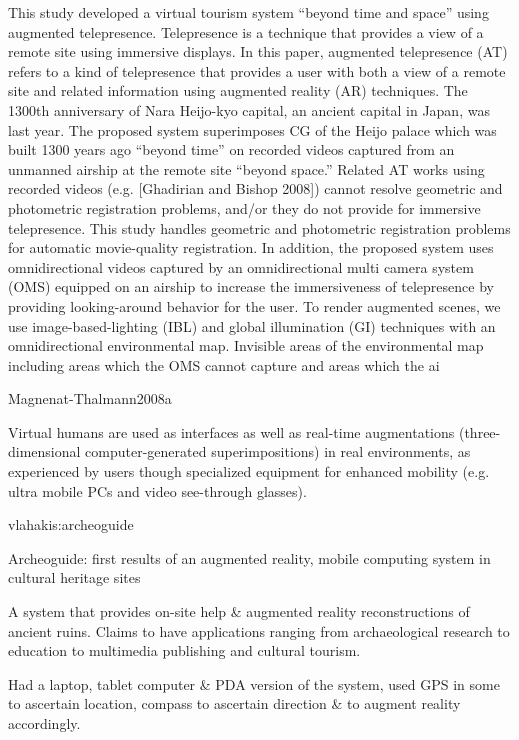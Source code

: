 This study developed a virtual tourism system “beyond time and
space” using augmented telepresence. Telepresence is a technique
that provides a view of a remote site using immersive displays. In
this paper, augmented telepresence (AT) refers to a kind of telepresence
that provides a user with both a view of a remote site and
related information using augmented reality (AR) techniques.
The 1300th anniversary of Nara Heijo-kyo capital, an ancient capital
in Japan, was last year. The proposed system superimposes
CG of the Heijo palace which was built 1300 years ago “beyond
time” on recorded videos captured from an unmanned airship at
the remote site “beyond space.” Related AT works using recorded
videos (e.g. [Ghadirian and Bishop 2008]) cannot resolve geometric
and photometric registration problems, and/or they do not provide
for immersive telepresence. This study handles geometric and
photometric registration problems for automatic movie-quality registration.
In addition, the proposed system uses omnidirectional
videos captured by an omnidirectional multi camera system (OMS)
equipped on an airship to increase the immersiveness of telepresence
by providing looking-around behavior for the user. To render
augmented scenes, we use image-based-lighting (IBL) and global
illumination (GI) techniques with an omnidirectional environmental
map. Invisible areas of the environmental map including areas
which the OMS cannot capture and areas which the ai


Magnenat-Thalmann2008a

Virtual humans are used as interfaces as well as real-time augmentations (three-dimensional computer-generated superimpositions) in real environments, as experienced by users though specialized equipment for enhanced mobility (e.g. ultra mobile PCs and video see-through glasses).


vlahakis:archeoguide

Archeoguide: first results of an augmented reality, mobile computing system in cultural heritage sites

A system that provides on-site help \& augmented reality reconstructions of ancient ruins. Claims to have
applications ranging from archaeological research to education to multimedia publishing and cultural
tourism.
        
Had a laptop, tablet computer \& PDA version of the system, used GPS in some to ascertain location, compass
to ascertain direction \& to augment reality accordingly.


